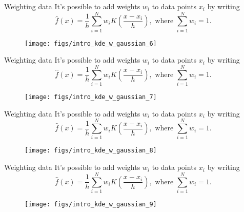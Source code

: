 \documentclass[11pt, aspectratio=149]{beamer}
\theoremstyle{plain}
\begin{document}
\begin{frame}[fragile, t]{Weighting data}
	It's possible to add weights $w_i$ to data points $x_i$ by writing
	\begin{equation*}
	\hat{f}(x) = \frac{1}{h} \sum_{i=1}^{N} w_i K\left(\frac{x - x_i}{h}\right), \text{ where } \sum_{i=1}^{N} w_i = 1.
	\end{equation*}
	\vfill
	\begin{figure}
		\centering
		\texttt{[image: figs/intro\_kde\_w\_gaussian\_6]}
	\end{figure}
\end{frame}


\begin{frame}[fragile, t]{Weighting data}
	It's possible to add weights $w_i$ to data points $x_i$ by writing
	\begin{equation*}
	\hat{f}(x) = \frac{1}{h} \sum_{i=1}^{N} w_i K\left(\frac{x - x_i}{h}\right), \text{ where } \sum_{i=1}^{N} w_i = 1.
	\end{equation*}
	\vfill
	\begin{figure}
		\centering
		\texttt{[image: figs/intro\_kde\_w\_gaussian\_7]}
	\end{figure}
\end{frame}


\begin{frame}[fragile, t]{Weighting data}
	It's possible to add weights $w_i$ to data points $x_i$ by writing
	\begin{equation*}
	\hat{f}(x) = \frac{1}{h} \sum_{i=1}^{N} w_i K\left(\frac{x - x_i}{h}\right), \text{ where } \sum_{i=1}^{N} w_i = 1.
	\end{equation*}
	\vfill
	\begin{figure}
		\centering
		\texttt{[image: figs/intro\_kde\_w\_gaussian\_8]}
	\end{figure}
\end{frame}


\begin{frame}[fragile, t]{Weighting data}
	It's possible to add weights $w_i$ to data points $x_i$ by writing
	\begin{equation*}
	\hat{f}(x) = \frac{1}{h} \sum_{i=1}^{N} w_i K\left(\frac{x - x_i}{h}\right), \text{ where } \sum_{i=1}^{N} w_i = 1.
	\end{equation*}
	\vfill
	\begin{figure}
		\centering
		\texttt{[image: figs/intro\_kde\_w\_gaussian\_9]}
	\end{figure}
\end{frame}
\end{document}
